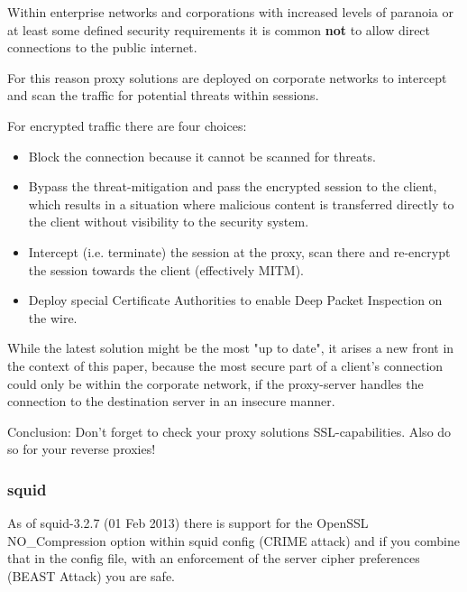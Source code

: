 
Within enterprise networks and corporations with increased levels of paranoia or at least some defined security requirements it is common \textbf{not} to allow direct connections to the public internet.

For this reason proxy solutions are deployed on corporate networks to intercept and scan the traffic for potential threats within sessions.

For encrypted traffic there are four choices:

\begin{itemize}
\item Block the connection because it cannot be scanned for threats.
\item Bypass the threat-mitigation and pass the encrypted session to the client, which results in a situation where malicious content is transferred directly to the client without visibility to the security system.
\item Intercept (i.e. terminate) the session at the proxy, scan there and re-encrypt the session towards the client (effectively MITM).
\item Deploy special Certificate Authorities to enable Deep Packet Inspection on the wire.
\end{itemize}

While the latest solution might be the most "up to date", it arises a new front in the context of this paper, because the most secure part of a client's connection could only be within the corporate network, if the proxy-server handles the connection to the destination server in an insecure manner.

Conclusion: Don't forget to check your proxy solutions SSL-capabilities. Also do so for your reverse proxies!

\subsubsection{squid}


As of squid-3.2.7 (01 Feb 2013) there is support for the OpenSSL NO\_Compression option within squid config (CRIME attack) and if you combine that in the config file, with an enforcement of the server cipher preferences (BEAST Attack) you are safe.

